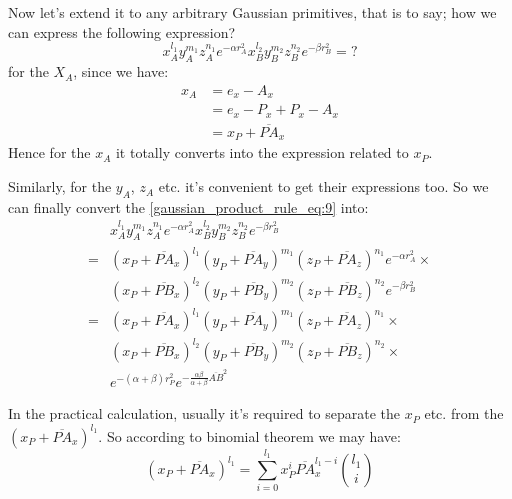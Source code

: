 Now let's extend it to any arbitrary Gaussian primitives, that is to say; how we can express 
the following expression?
\begin{equation}
   x_{A}^{l_{1}}y_{A}^{m_{1}}z_{A}^{n_{1}}e^{-\alpha r_{A}^{2}}
   x_{B}^{l_{2}}y_{B}^{m_{2}}z_{B}^{n_{2}}e^{-\beta  r_{B}^{2}}   =  ?
\label{gaussian_product_rule_eq:9}
\end{equation}
for the $X_{A}$, since we have:
\begin{equation}
\begin{split}
 x_{A} &= e_{x} - A_{x} \\
       &= e_{x} - P_{x} + P_{x} - A_{x} \\
       &= x_{P} + \overline{PA}_{x} 
\end{split}
 \label{gaussian_product_rule_eq:10}
\end{equation}
Hence for the $x_{A}$ it totally converts into the expression related to $x_{P}$.

Similarly, for the $y_{A}$, $z_{A}$ etc. it's convenient to get their expressions too. So we can
finally convert the \ref{gaussian_product_rule_eq:9} into:
\begin{align}
&  x_{A}^{l_{1}}y_{A}^{m_{1}}z_{A}^{n_{1}}e^{-\alpha r_{A}^{2}}
   x_{B}^{l_{2}}y_{B}^{m_{2}}z_{B}^{n_{2}}e^{-\beta  r_{B}^{2}} \nonumber \\
=& (x_{P} + \overline{PA}_{x})^{l_{1}}(y_{P} + \overline{PA}_{y})^{m_{1}}
   (z_{P} + \overline{PA}_{z})^{n_{1}}e^{-\alpha r_{A}^{2}} \times \nonumber \\
&  (x_{P} + \overline{PB}_{x})^{l_{2}}(y_{P} + \overline{PB}_{y})^{m_{2}}
   (z_{P} + \overline{PB}_{z})^{n_{2}}e^{-\beta  r_{B}^{2}} \nonumber \\
=& (x_{P} + \overline{PA}_{x})^{l_{1}}(y_{P} + \overline{PA}_{y})^{m_{1}}
   (z_{P} + \overline{PA}_{z})^{n_{1}} \times \nonumber \\
&  (x_{P} + \overline{PB}_{x})^{l_{2}}(y_{P} + \overline{PB}_{y})^{m_{2}}
   (z_{P} + \overline{PB}_{z})^{n_{2}} \times \nonumber \\
&  e^{-(\alpha+\beta)r_{P}^{2}} e^{-\frac{\alpha\beta}{\alpha+\beta}
\overline{AB}^{2}}
  \label{gaussian_product_rule_eq:11}
\end{align}

In the practical calculation, usually it's required to separate the $x_{P}$ etc. from the 
$(x_{P} +\overline{PA}_{x})^{l_{1}}$. So according to binomial theorem we may have:
\begin{equation}
 (x_{P} +\overline{PA}_{x})^{l_{1}} = \sum_{i=0}^{l_{1}} x_{P}^{i}\overline{PA}_{x}^{l_{1}-i}
\binom{l_{1}}{i}
 \label{gaussian_product_rule_eq:12}
\end{equation}

